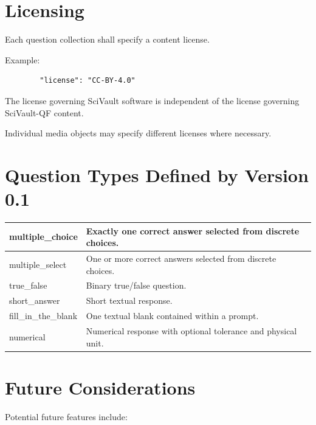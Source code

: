 \documentclass[11pt]{article}
\begin{document}
	\section{Licensing}
	
	Each question collection shall specify a content license.
	
	Example:
	
	\begin{lstlisting}
		"license": "CC-BY-4.0"
	\end{lstlisting}
	
	The license governing SciVault software is independent of the license
	governing SciVault-QF content.
	
	Individual media objects may specify different licenses where necessary.
	
	\section{Question Types Defined by Version 0.1}
	
	\begin{longtable}{|>{\ttfamily}p{4cm}|p{9.5cm}|}
		\hline
		multiple\_choice & Exactly one correct answer selected from discrete choices. \\ \hline
		multiple\_select & One or more correct answers selected from discrete choices. \\ \hline
		true\_false & Binary true/false question. \\ \hline
		short\_answer & Short textual response. \\ \hline
		fill\_in\_the\_blank & One textual blank contained within a prompt. \\ \hline
		numerical & Numerical response with optional tolerance and physical unit. \\ \hline
	\end{longtable}
	
	\section{Future Considerations}
	
	Potential future features include:
	
\end{document}
